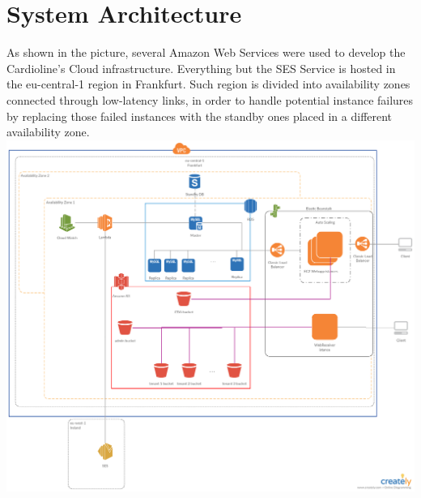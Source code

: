 \section{System Architecture}
As shown in the picture, several Amazon Web Services were used to develop the Cardioline's Cloud infrastructure.
Everything but the SES Service is hosted in the eu-central-1 region in Frankfurt. Such region is divided into availability zones connected through low-latency links, in order to handle potential instance failures by replacing those failed instances with the standby ones placed in a different availability zone.\\
\includegraphics[width=\textwidth]{architecture}
